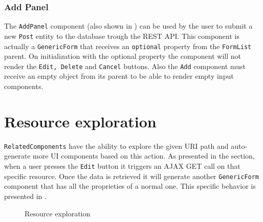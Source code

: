 \subsubsection{Add Panel}
\label{sec:add-panel}

The \texttt{AddPanel} component (also shown in ) can be used by the user to submit a new \texttt{Post} entity to the database trough the REST API. This component is actually a \texttt{GenericForm} that receives an \texttt{optional} property from the \texttt{FormList} parent. On initialization with the optional property the component will not render the \texttt{Edit, Delete} and \texttt{Cancel} buttons. Also the \texttt{Add} component must receive an empty object from its parent to be able to render empty input components.


\section{Resource exploration}
\label{sec:panel-nesting}

\texttt{RelatedComponents} have the ability to explore the given URI path and auto-generate more UI components based on this action. As presented in the  section, when a user presses the \texttt{Edit} button it triggers an AJAX GET call on that specific resource. Once the data is retrieved it will generate another \texttt{GenericForm} component that has all the proprieties of a normal one. This specific behavior is presented in .


\begin{figure}[H]
	\centering
	\caption{Resource exploration\label{img:nesting}}
\end{figure}

